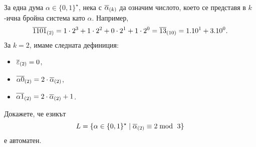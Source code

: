 За една дума $\alpha \in \{0,1\}^\star$, 
нека с $\overline{\alpha}_{(k)}$ да означим числото, което се представя в $k$-ична бройна система като $\alpha$.
Например, 
\[\overline{1101}_{(2)} = 1 \cdot 2^3+1\cdot 2^2+0\cdot 2^1+1\cdot 2^0 = \overline{13}_{(10)} = 1.10^1 + 3.10^0.\]
За $k = 2$, имаме следната дефиниция:
\begin{itemize}
\item
  $\overline{\varepsilon}_{(2)} = 0$,
\item
  $\overline{\alpha 0}_{(2)} = 2\cdot \overline{\alpha}_{(2)}$,
\item
  $\overline{\alpha 1}_{(2)} = 2\cdot \overline{\alpha}_{(2)} + 1$.
\end{itemize}

\begin{problem}\label{prob:regular:dfa:binary}
  Докажете, че езикът
  \[L = \{\alpha \in \{0,1\}^\star \mid \overline{\alpha}_{(2)} \equiv 2 \bmod\ 3\}\]
  е автоматен.
\end{problem}
